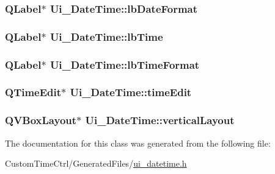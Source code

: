 \label{class_ui___date_time_a2c9c40ac284a6523d361201e4c0c2ec7}
\hypertarget{class_ui___date_time_ae2e82ce0d9b527827658c605e4f814e7}{
\subsubsection[{lbDateFormat}]{\setlength{\rightskip}{0pt plus 5cm}QLabel$\ast$ {\bf Ui\_\-DateTime::lbDateFormat}}}
\label{class_ui___date_time_ae2e82ce0d9b527827658c605e4f814e7}
\hypertarget{class_ui___date_time_a3a3c6501192cd0e3d6586310689bcd3f}{
\subsubsection[{lbTime}]{\setlength{\rightskip}{0pt plus 5cm}QLabel$\ast$ {\bf Ui\_\-DateTime::lbTime}}}
\label{class_ui___date_time_a3a3c6501192cd0e3d6586310689bcd3f}
\hypertarget{class_ui___date_time_a8701c245df77db5561ea1c0964c20a8f}{
\subsubsection[{lbTimeFormat}]{\setlength{\rightskip}{0pt plus 5cm}QLabel$\ast$ {\bf Ui\_\-DateTime::lbTimeFormat}}}
\label{class_ui___date_time_a8701c245df77db5561ea1c0964c20a8f}
\hypertarget{class_ui___date_time_a37289c6e591cee258708a9736b503415}{
\subsubsection[{timeEdit}]{\setlength{\rightskip}{0pt plus 5cm}QTimeEdit$\ast$ {\bf Ui\_\-DateTime::timeEdit}}}
\label{class_ui___date_time_a37289c6e591cee258708a9736b503415}
\hypertarget{class_ui___date_time_a5b1cbbfbf53e56fae7a1d7010cd6dd78}{
\subsubsection[{verticalLayout}]{\setlength{\rightskip}{0pt plus 5cm}QVBoxLayout$\ast$ {\bf Ui\_\-DateTime::verticalLayout}}}
\label{class_ui___date_time_a5b1cbbfbf53e56fae7a1d7010cd6dd78}


The documentation for this class was generated from the following file:\begin{DoxyCompactItemize}
\item 
CustomTimeCtrl/GeneratedFiles/\hyperlink{ui__datetime_8h}{ui\_\-datetime.h}\end{DoxyCompactItemize}

